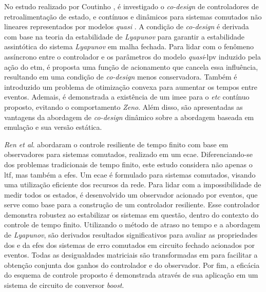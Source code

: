 No estudo realizado por Coutinho \cite{coutinho2021}, é investigado o \textit{co-design} de controladores de retroalimentação de estado, e  contínuos e dinâmicos para sistemas comutados não lineares representados por modelos \textit{quasi} . A condição de \textit{co-design} é derivada com base na teoria da estabilidade de \textit{Lyapunov} para garantir a estabilidade assintótica do sistema \textit{Lyapunov} em malha fechada. Para lidar com o fenômeno assíncrono entre o controlador e os parâmetros do modelo \textit{quasi}-\acrshort{lpv} induzido pela ação do \acrshort{etm}, é proposta uma função de acionamento que cancela essa influência, resultando em uma condição de \textit{co-design} menos conservadora. Também é introduzido um problema de otimização convexa para aumentar os tempos entre eventos. Ademais, é demonstrada a existência de um \acrfull{imee} para o \textit{etc} contínuo proposto, evitando o comportamento \textit{Zeno}. Além disso, são apresentadas as vantagens da abordagem de \textit{co-design} dinâmico sobre a abordagem baseada em emulação e sua versão estática.

\textit{Ren et al}. \cite{Ren2018} abordaram o controle resiliente de tempo finito com base em observadores para sistemas comutados, realizado em um \acrfull{ecae}. Diferenciando-se dos problemas tradicionais de tempo finito, este estudo considera não apenas o \acrfull{ltf}, mas também a \acrfull{efes}. Um \acrshort{ecae} é formulado para sistemas comutados, visando uma utilização eficiente dos recursos da rede. Para lidar com a impossibilidade de medir todos os estados, é desenvolvido um observador acionado por eventos, que serve como base para a construção de um controlador resiliente. Esse controlador demonstra robustez ao estabilizar os sistemas em questão, dentro do contexto do controle de tempo finito. Utilizando o método de atraso no tempo e a abordagem de \textit{Lyapunov}, são derivados resultados significativos para avaliar as propriedades dos  e da \acrshort{efes} dos sistemas de erro comutados em circuito fechado acionados por eventos. Todas as desigualdades matriciais são transformadas em  para facilitar a obtenção conjunta dos ganhos do controlador e do observador. Por fim, a eficácia do esquema de controle proposto é demonstrada através de sua aplicação em um sistema de circuito de conversor \textit{boost}.

